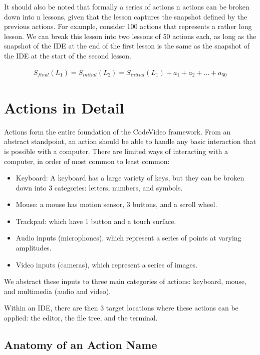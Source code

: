 \documentclass[11pt, a4paper]{article}
\begin{document}
It should also be noted that formally a series of actions n actions can be broken down into n lessons, given that the lesson captures the snapshot defined by the previous actions. For example, consider 100 actions that represents a rather long lesson. We can break this lesson into two lessons of 50 actions each, as long as the snapshot of the IDE at the end of the first lesson is the same as the snapshot of the IDE at the start of the second lesson.

\begin{align*}
    S_{final}(L_1) = S_{initial}(L_2) = S_{initial}(L_1) + a_{1} + a_{2} + \dots + a_{50}
\end{align*}

\section{Actions in Detail}

Actions form the entire foundation of the CodeVideo framework. From an abstract standpoint, an action should be able to handle any basic interaction that is possible with a computer. There are limited ways of interacting with a computer, in order of most common to least common:

\begin{itemize}
    \item Keyboard: A keyboard has a large variety of keys, but they can be broken down into 3 categories: letters, numbers, and symbols.
    \item Mouse: a mouse has motion sensor, 3 buttons, and a scroll wheel.
    \item Trackpad: which have 1 button and a touch surface.
    \item Audio inputs (microphones), which represent a series of points at varying amplitudes.
    \item Video inputs (cameras), which represent a series of images.
\end{itemize}

We abstract these inputs to three main categories of actions: keyboard, mouse, and multimedia (audio and video).

Within an IDE, there are then 3 target locations where these actions can be applied: the editor, the file tree, and the terminal.

\subsection{Anatomy of an Action Name}
\end{document}
